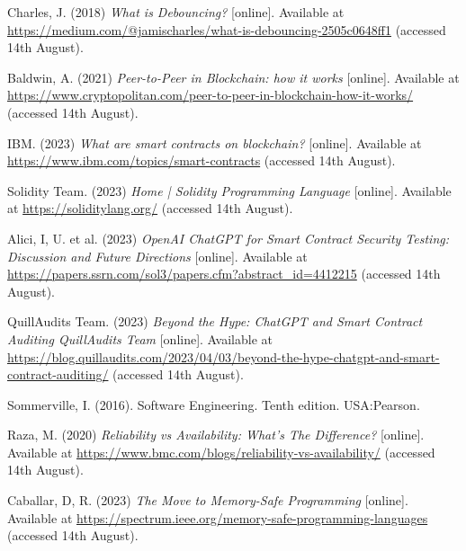 \noindent [26] Charles, J. (2018) \textit{What is Debouncing?} [online]. Available at \url{https://medium.com/@jamischarles/what-is-debouncing-2505c0648ff1} (accessed 14th August).
 \vspace{0.2cm}

 \noindent [27] Baldwin, A. (2021) \textit{Peer-to-Peer in Blockchain: how it works} [online]. Available at \url{https://www.cryptopolitan.com/peer-to-peer-in-blockchain-how-it-works/} (accessed 14th August).
 \vspace{0.2cm}

 \noindent [28] IBM. (2023) \textit{What are smart contracts on blockchain?} [online]. Available at \url{https://www.ibm.com/topics/smart-contracts} (accessed 14th August).
 \vspace{0.2cm}

 \noindent [29] Solidity Team. (2023) \textit{Home | Solidity Programming Language} [online]. Available at \url{https://soliditylang.org/} (accessed 14th August).
 \vspace{0.2cm}

 \noindent [30] Alici, I, U. et al. (2023) \textit{OpenAI ChatGPT for Smart Contract Security Testing: Discussion and Future Directions} [online]. Available at \url{https://papers.ssrn.com/sol3/papers.cfm?abstract_id=4412215} (accessed 14th August).
 \vspace{0.2cm}

 \noindent [31] QuillAudits Team. (2023) \textit{Beyond the Hype: ChatGPT and Smart Contract Auditing QuillAudits Team} [online]. Available at \url{https://blog.quillaudits.com/2023/04/03/beyond-the-hype-chatgpt-and-smart-contract-auditing/} (accessed 14th August).
 \vspace{0.2cm}

 \noindent [32] Sommerville, I. (2016). Software Engineering. Tenth edition. USA:Pearson.
 \vspace{0.2cm}
 
 \noindent [33] Raza, M. (2020) \textit{Reliability vs Availability: What's The Difference?} [online]. Available at \url{https://www.bmc.com/blogs/reliability-vs-availability/} (accessed 14th August).
 \vspace{0.2cm}

 \noindent [34] Caballar, D, R. (2023) \textit{The Move to Memory-Safe Programming} [online]. Available at \url{https://spectrum.ieee.org/memory-safe-programming-languages} (accessed 14th August).
 \vspace{0.2cm}

